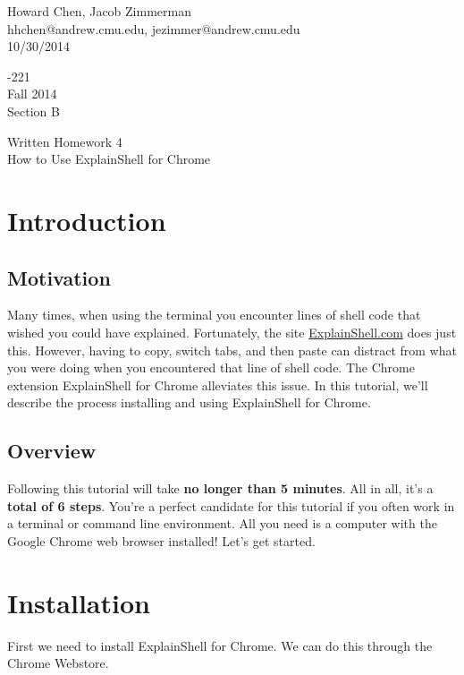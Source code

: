 \documentclass[11pt]{article}
\begin{document}
\thispagestyle{empty}
\noindent
\begin{minipage}[width=0.7\linewidth]{0.7\linewidth}
  Howard Chen, Jacob Zimmerman\\
  hhchen@andrew.cmu.edu, jezimmer@andrew.cmu.edu\\
  10/30/2014
\end{minipage}
\hfill
\begin{minipage}[width=0.3\linewidth]{0.3\linewidth}
  -221\\
  Fall 2014\\
  Section B
\end{minipage}

\begin{center}
  Written Homework 4\\
  How to Use ExplainShell for Chrome
\end{center}
\newpage

\tableofcontents

\newpage

\section{Introduction}

\subsection{Motivation}
Many times, when using the terminal you encounter lines of shell code that wished you could have explained. Fortunately, the site \href{http://explainshell.com/}{ExplainShell.com} does just this. However, having to copy, switch tabs, and then paste can distract from what you were doing when you encountered that line of shell code. The Chrome extension ExplainShell for Chrome alleviates this issue. In this tutorial, we'll describe the process installing and using ExplainShell for Chrome.


\subsection{Overview}
Following this tutorial will take \textbf{no longer than 5 minutes}. All in all, it's a \textbf{total of 6 steps}. You're a perfect candidate for this tutorial if you often work in a terminal or command line environment. All you need is a computer with the Google Chrome web browser installed! Let's get started.

\newpage

\section{Installation}
First we need to install ExplainShell for Chrome. We can do this through the Chrome Webstore.
\end{document}
